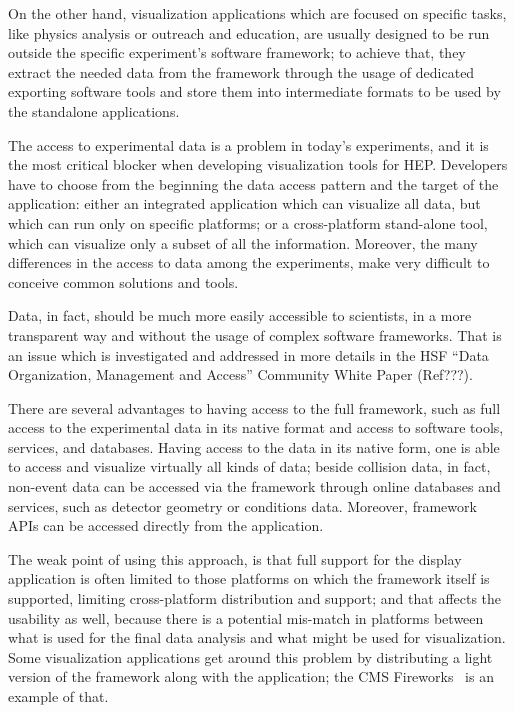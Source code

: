 \documentclass[12pt,a4paper]{article}
\begin{document}
On the other hand, visualization applications which are focused on specific tasks, like physics analysis or outreach
and education, are usually designed to be run outside the specific experiment’s software framework; to achieve that,
they extract the needed data from the framework through the usage of dedicated exporting software tools and store them
into intermediate formats to be used by the standalone applications.

The access to experimental data is a problem in today’s experiments, and it is the most critical blocker when developing
visualization tools for HEP. Developers have to choose from the beginning the data access pattern and the target of the
application: either an integrated application which can visualize all data, but which can run only on specific platforms;
or a cross-platform stand-alone tool, which can visualize only a subset of all the information. Moreover, the many
differences in the access to data among the experiments, make very difficult to conceive common solutions and tools.

Data, in fact, should be much more easily accessible to scientists, in a more transparent way and without the usage of
complex software frameworks. That is an issue which is investigated and addressed in more details in the HSF
“Data Organization, Management and Access”  Community White Paper (Ref???).

There are several advantages to having access to the full framework, such as full access to the experimental data
in its native format and access to software tools, services, and databases. Having access to the data in its native form,
one is able to access and visualize virtually all kinds of data; beside collision data, in fact, non-event data can be
accessed via the framework through online databases and services, such as detector geometry or conditions data. Moreover,
framework APIs can be accessed directly from the application.

The weak point of using this approach, is that full support for the display application is often limited to those platforms
on which the framework itself is supported, limiting cross-platform distribution and support; and that affects the usability
as well, because there is a potential mis-match in platforms between what is used for the final data analysis and what might
be used for visualization. Some visualization applications get around this problem by distributing a light version of the
framework along with the application; the CMS Fireworks~\cite{CMSFireworks} is an example of that.
\end{document}
